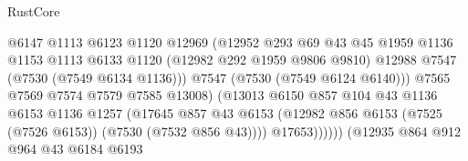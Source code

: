 \begin{lexlean}{RustCore}
\begin{coremodule}
                                          @6147
                                          @1113
                                          @6123
                                          @1120
                                          @12969
                                          (@12952
                                            @293
                                            @69
                                            @43
                                            @45
                                            @1959
                                            @1136
                                            @1153
                                            @1113
                                            @6133
                                            @1120
                                            (@12982 @292 @1959 @9806 @9810)
                                            @12988
                                            @7547
                                            (@7530 (@7549 @6134 @1136)))
                                          @7547
                                          (@7530 (@7549 @6124 @6140)))
                                        @7565
                                        @7569
                                        @7574
                                        @7579
                                        @7585
                                        @13008)
                                      (@13013
                                        @6150
                                        @857
                                        @104
                                        @43
                                        @1136
                                        @6153
                                        @1136
                                        @1257
                                        (@17645
                                          @857
                                          @43
                                          @6153
                                          (@12982
                                            @856
                                            @6153
                                            (@7525 (@7526 @6153))
                                            (@7530 (@7532 @856 @43))))
                                        @17653))))))
                            (@12935
                              @864
                              @912
                              @964
                              @43
                              @6184
                              @6193

\end{coremodule}
\end{lexlean}
